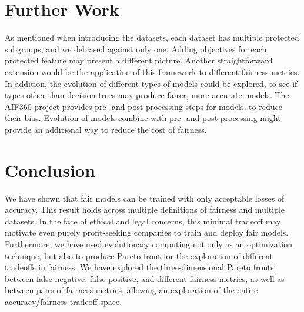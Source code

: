 \documentclass[10pt]{acmart}
\begin{document}
\section{Further Work}
As mentioned when introducing the datasets, each dataset has multiple protected subgroups, and we debiased against only one. Adding objectives for each protected feature may present a different picture. Another straightforward extension would be the application of this framework to different fairness metrics. In addition, the evolution of different types of models could be explored, to see if types other than decision trees may produce fairer, more accurate models. The AIF360 project provides pre- and post-processing steps for models, to reduce their bias. Evolution of models combine with pre- and post-processing might provide an additional way to reduce the cost of fairness.

\section{Conclusion}
We have shown that fair models can be trained with only acceptable losses of accuracy. This result holds across multiple definitions of fairness and multiple datasets. In the face of ethical and legal concerns, this minimal tradeoff may motivate even purely profit-seeking companies to train and deploy fair models. Furthermore, we have used evolutionary computing not only as an optimization technique, but also to produce Pareto front for the exploration of different tradeoffs in fairness. We have explored the three-dimensional Pareto fronts between false negative, false positive, and different fairness metrics, as well as between pairs of fairness metrics, allowing an exploration of the entire accuracy/fairness tradeoff space.



\end{document}
